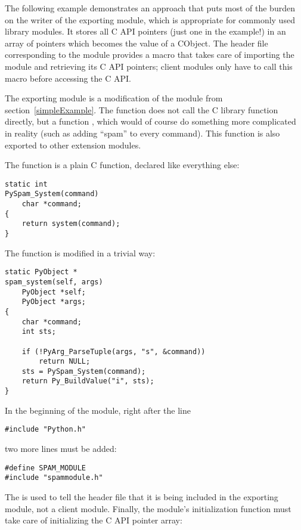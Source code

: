 \documentclass{manual}
\begin{document}
The following example demonstrates an approach that puts most of the
burden on the writer of the exporting module, which is appropriate
for commonly used library modules. It stores all C API pointers
(just one in the example!) in an array of  pointers which
becomes the value of a CObject. The header file corresponding to
the module provides a macro that takes care of importing the module
and retrieving its C API pointers; client modules only have to call
this macro before accessing the C API.

The exporting module is a modification of the  module from
section~\ref{simpleExample}. The function 
does not call the C library function  directly,
but a function , which would of course do
something more complicated in reality (such as adding ``spam'' to
every command). This function  is also
exported to other extension modules.

The function  is a plain C function,
declared  like everything else:

\begin{verbatim}
static int
PySpam_System(command)
    char *command;
{
    return system(command);
}
\end{verbatim}

The function  is modified in a trivial way:

\begin{verbatim}
static PyObject *
spam_system(self, args)
    PyObject *self;
    PyObject *args;
{
    char *command;
    int sts;

    if (!PyArg_ParseTuple(args, "s", &command))
        return NULL;
    sts = PySpam_System(command);
    return Py_BuildValue("i", sts);
}
\end{verbatim}

In the beginning of the module, right after the line

\begin{verbatim}
#include "Python.h"
\end{verbatim}

two more lines must be added:

\begin{verbatim}
#define SPAM_MODULE
#include "spammodule.h"
\end{verbatim}

The  is used to tell the header file that it is being
included in the exporting module, not a client module. Finally,
the module's initialization function must take care of initializing
the C API pointer array:
\end{document}
